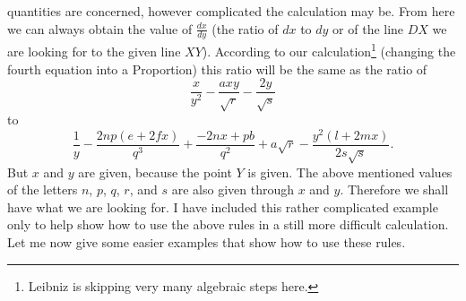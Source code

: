 \documentclass[polutonikogreek,english,twoside,openright]{article}
\begin{document}
quantities are concerned, however complicated the calculation may be.
From here we can always obtain the value of $\frac{dx}{dy}$ (the ratio
of $dx$ to $dy$ or of the line $DX$ we are looking for to the given
line $XY$).  According to our calculation\footnote{Leibniz is skipping
  very many algebraic steps here.} (changing the fourth equation into
a Proportion) this ratio will be the same as the ratio of
$$ \frac{x}{y^2} - \frac{axy}{\sqrt{r}}  - \frac{2y}{\sqrt{s}}$$ to
$$\frac{1}{y} - \frac{2np(e + 2fx)}{q^3} + \frac{-2nx + pb}{q^2}
+ a\sqrt{r} - \frac{y^2(l + 2mx)}{2s\sqrt{s}}.$$ But $x$ and $y$ are
given, because the point $Y$ is given.  The above mentioned values of
the letters $n$, $p$, $q$, $r$, and $s$ are also given through $x$ and
$y$.  Therefore we shall have what we are looking for.  I have
included this rather complicated example only to help show how to use
the above rules in a still more difficult calculation.  Let me now
give some easier examples that show how to use these
rules.\label{enmex1}
\end{document}
